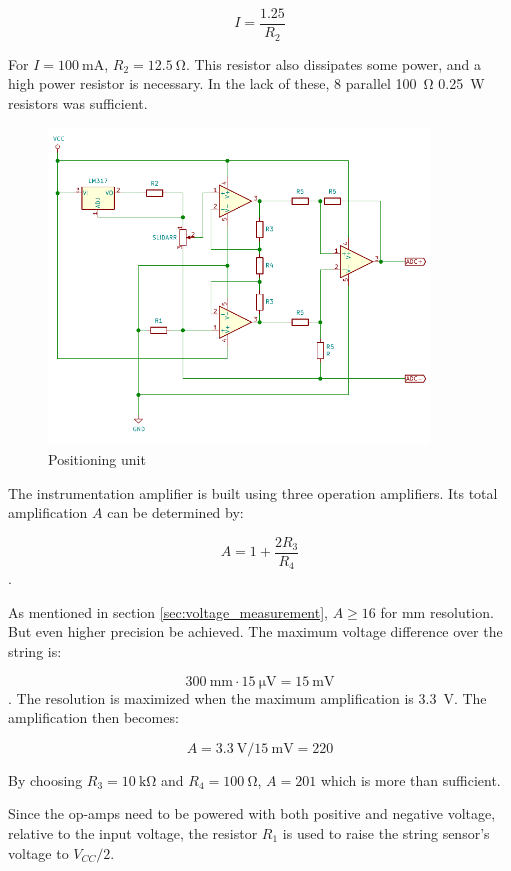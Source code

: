 \documentclass{article}
\begin{document}
$$ I = \frac{1.25}{R_2} $$

For $ I = \SI{100}{\milli\ampere} $, $R_2 = \SI{12.5}{\ohm} $. This resistor also dissipates some power, and a high power resistor is necessary. In the lack of these, 8 parallel \SI{100}{\ohm} \SI{0.25}{\watt} resistors was sufficient.

\begin{figure}[h]
  \centering
  \includegraphics[width=0.9\textwidth]{slidarr-circuit}
  \caption{Positioning unit}
  \label{fig:slidarr-circuit}
\end{figure}

The instrumentation amplifier is built using three operation amplifiers. Its total amplification $A$ can be determined by:

$$ A = 1 + \frac{2R_3}{R_4} $$. 

As mentioned in section \ref{sec:voltage_measurement}, $ A \geq 16 $ for \si{\milli\meter} resolution. But even higher precision be achieved. The maximum voltage difference over the string is:

$$\SI{300}{\milli\meter} \cdot \SI{15}{\micro\volt}= \SI{15}{\milli\volt} $$. 
The resolution is maximized when the maximum amplification is \SI{3.3}{\volt}. The amplification then becomes:

$$ A = \SI{3.3}{\volt} / \SI{15}{\milli\volt} = 220 $$ 

By choosing $R_3 = \SI{10}{\kilo\ohm} $ and $R_4 = \SI{100}{\ohm} $, $ A = 201 $ which is more than sufficient.

Since the op-amps need to be powered with both positive and negative voltage, relative to the input voltage, the resistor $R_1$ is used to raise the string sensor's voltage to $V_{CC}/2$.
\end{document}
